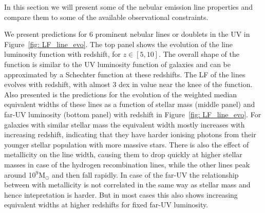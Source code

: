 In this section we will present some of the nebular emission line properties and compare them to some of the available observational constraints. 
 
We present predictions for 6 prominent nebular lines or doublets in the UV in Figure~\ref{fig: LF_line_evo}. The top panel shows the evolution of the line luminosity function with redshift, for $z\in[5,10]$. The overall shape of the function is similar to the UV luminosity function of galaxies and can be approximated by a Schechter function at these redshifts. The LF of the lines evolves with redshift, with almost 3 dex in value near the knee of the function. Also presented is the predictions for the evolution of the weighted median equivalent widths of these lines as a function of stellar mass (middle panel) and far-UV luminosity (bottom panel) with redshift in Figure~\ref{fig: LF_line_evo}. For galaxies with similar stellar mass the equivalent width mostly increases with increasing redshift, indicating that they have harder ionising photons from their younger stellar population with more massive stars. There is also the effect of metallicity on the line width, causing them to drop quickly at higher stellar masses in case of the hydrogen recombination lines, while the other lines peak around 10$^9$M$_{\odot}$ and then fall rapidly. In case of the far-UV the relationship between with metallicity is not correlated in the same way as stellar mass and hence intepretation is harder. But in most cases this also shows increasing equivalent widths at higher redshifts for fixed far-UV luminosity. 

